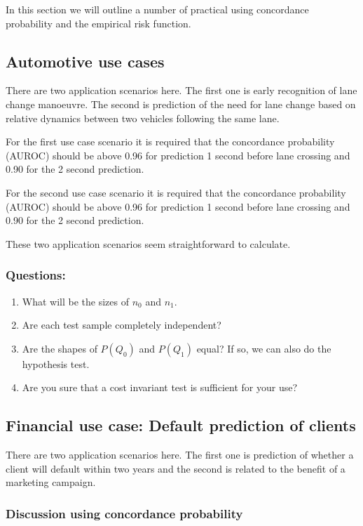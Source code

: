 \documentclass{article}
\theoremstyle{theorem}
\theoremstyle{definition}
\begin{document}
In this section we will outline a number of practical using concordance probability and the empirical risk function.

\subsection{Automotive use cases }
\label{sec:automotive}

There are two application scenarios here.  The first one is early recognition of lane change manoeuvre. The second is prediction of the need for lane change based on relative dynamics between two vehicles following the same lane.

For the first use case scenario it is required that the concordance probability (AUROC) should be above 0.96 for prediction 1 second before lane crossing and 0.90 for the 2 second prediction.

For the second use case scenario it is required that the concordance probability (AUROC) should be above 0.96 for prediction 1 second before lane crossing and 0.90 for the 2 second prediction.

These two application scenarios seem straightforward to calculate.

\subsubsection*{Questions: }
\begin{enumerate}
\item What will be the sizes of $n_0$ and $n_1$.
\item Are each test sample completely independent?
\item Are the shapes of $P(Q_0)$ and $P(Q_1)$ equal? If so, we can also do the hypothesis test.
\item Are you sure that a cost invariant test is sufficient for your use?
\end{enumerate}


\subsection{Financial use case: Default prediction of clients}
\label{sec:financial}

There are two application scenarios here.  The first one is prediction of whether a client will default within two years and the second is related to the benefit of a marketing campaign.

\subsubsection*{Discussion using concordance probability}
\end{document}
